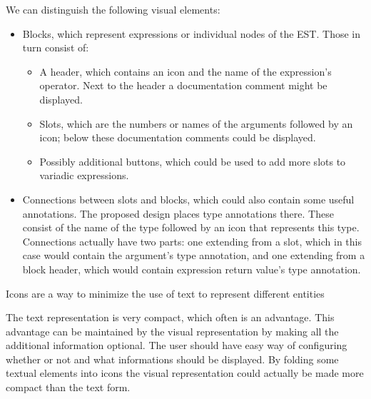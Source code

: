 We can distinguish the following visual elements:
\begin{itemize}
	\item Blocks, which represent expressions or individual nodes of the
          EST. Those in turn consist of:
	\begin{itemize}
		\item A header, which contains an icon and the name of the
                  expression's operator. Next to the header a documentation
                  comment might be displayed.
		\item Slots, which are the numbers or names of the arguments
                  followed by an icon; below these documentation comments could
                  be displayed.
		\item Possibly additional buttons, which could be used to add
                  more slots to variadic expressions.
	\end{itemize}
	\item Connections between slots and blocks, which could also contain
          some useful annotations. The proposed design places type annotations
          there. These consist of the name of the type followed by an icon that
          represents this type. Connections actually have two parts: one
          extending from a slot, which in this case would contain the argument's
          type annotation, and one extending from a block header, which would
          contain expression return value's type annotation.
\end{itemize}

Icons are a way to minimize the use of text to represent different entities

The text representation is very compact, which often is an advantage. This
advantage can be maintained by the visual representation by making all the
additional information optional. The user should have easy way of configuring
whether or not and what informations should be displayed. By folding some
textual elements into icons the visual representation could actually be made
more compact than the text form.

